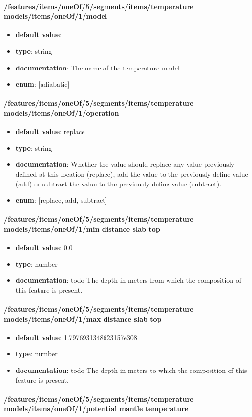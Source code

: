 \paragraph{/features/items/oneOf/5/segments/items/temperature models/items/oneOf/1/model}
\begin{itemize}\item {\bf default value}: 
\item {\bf type}: string
\item {\bf documentation}: The name of the temperature model.
\item {\bf enum}: [adiabatic]\end{itemize}\paragraph{/features/items/oneOf/5/segments/items/temperature models/items/oneOf/1/operation}
\begin{itemize}\item {\bf default value}: replace
\item {\bf type}: string
\item {\bf documentation}: Whether the value should replace any value previously defined at this location (replace), add the value to the previously define value (add) or subtract the value to the previously define value (subtract).
\item {\bf enum}: [replace, add, subtract]\end{itemize}\paragraph{/features/items/oneOf/5/segments/items/temperature models/items/oneOf/1/min distance slab top}
\begin{itemize}\item {\bf default value}: 0.0
\item {\bf type}: number
\item {\bf documentation}: todo The depth in meters from which the composition of this feature is present.
\end{itemize}\paragraph{/features/items/oneOf/5/segments/items/temperature models/items/oneOf/1/max distance slab top}
\begin{itemize}\item {\bf default value}: 1.7976931348623157e308
\item {\bf type}: number
\item {\bf documentation}: todo The depth in meters to which the composition of this feature is present.
\end{itemize}\paragraph{/features/items/oneOf/5/segments/items/temperature models/items/oneOf/1/potential mantle temperature}

